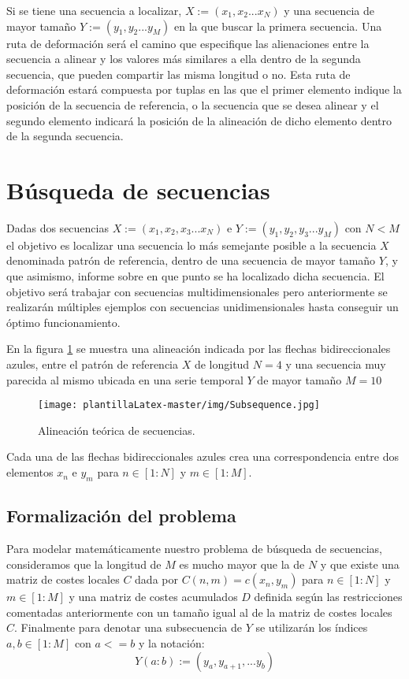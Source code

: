 Si se tiene una secuencia a localizar, $X:=(x_1, x_2 ... x_N)$ y una secuencia de mayor tamaño $Y:=(y_1, y_2 ... y_M)$ en la que buscar la primera secuencia. Una ruta de deformación será el camino que especifique las alienaciones entre la secuencia a alinear y los valores más similares a ella dentro de la segunda secuencia, que pueden compartir las misma longitud o no. Esta ruta de deformación estará compuesta por tuplas en las que el primer elemento indique la posición de la secuencia de referencia, o la secuencia que se desea alinear y el segundo elemento indicará la posición de la alineación de dicho elemento dentro de la segunda secuencia. 


\section{Búsqueda de secuencias}
Dadas dos secuencias $ X := ( x_{1}, x_{2}, x_{3} ... x_{N}) $ e $ Y := ( y_{1}, y_{2}, y_{3} ... y_{M}) $ con $ N < M $ el objetivo es localizar una secuencia lo más semejante posible a la secuencia $X$ denominada patrón de referencia, dentro de una secuencia de mayor tamaño $Y$, y que asimismo, informe sobre en que punto se ha localizado dicha secuencia. 
El objetivo será trabajar con secuencias multidimensionales pero anteriormente se realizarán múltiples ejemplos con secuencias unidimensionales hasta conseguir un óptimo funcionamiento. 

En la figura \ref{fig:dtw5} se muestra una alineación indicada por las flechas bidireccionales azules, entre el patrón de referencia $X$ de longitud $N=4$ y una secuencia muy parecida al mismo ubicada en una serie temporal $Y$ de mayor tamaño $M=10$

\begin{figure}
    \centering
    \texttt{[image: plantillaLatex-master/img/Subsequence.jpg]}
    \caption{Alineación teórica de secuencias.}
    \label{fig:dtw5}
\end{figure}

Cada una de las flechas bidireccionales azules crea una correspondencia entre dos elementos $x_n$ e $y_m$ para $n \in [1:N]$ y $m \in [1:M] $.


\subsection{Formalización del problema}
Para modelar matemáticamente nuestro problema de búsqueda de secuencias, consideramos que la longitud de $M$ es mucho mayor que la de $N$ y que existe una matriz de costes locales $C$ dada por $C(n,m)=c(x_n,y_m)$ para $n \in [1:N] $ y $m \in [1:M] $ y una matriz de costes acumulados $D$ definida según las restricciones comentadas anteriormente con un tamaño igual al de la matriz de costes locales $C$. Finalmente para denotar  una subsecuencia de $Y$ se utilizarán los índices $a,b \in [1:M]$ con $a<=b$ y la notación:
\begin{equation}
    Y(a:b):=(y_a, y_{a+1},... y_b)
\end{equation}
